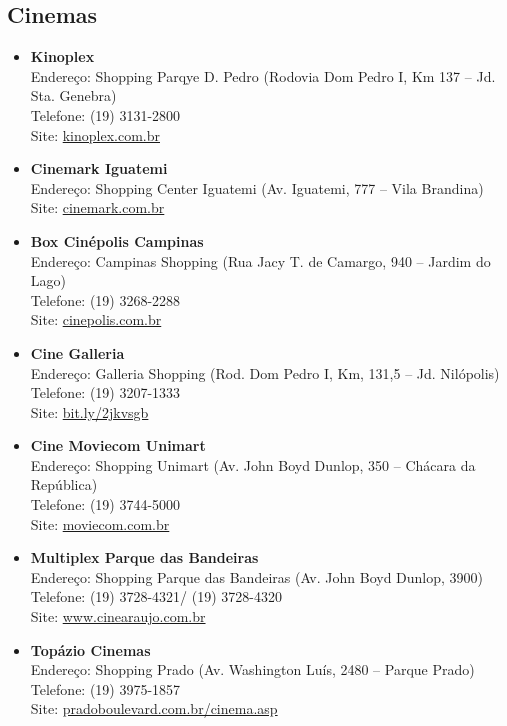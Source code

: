 \subsection{Cinemas}

\begin{itemize}
\item \textbf{Kinoplex}
  \\Endereço: Shopping Parqye D. Pedro (Rodovia Dom Pedro I, Km 137 -- Jd. Sta.
  Genebra)
  \\Telefone: (19) 3131-2800
  \\Site: \url{kinoplex.com.br}

\item \textbf{Cinemark Iguatemi}
  \\Endereço: Shopping Center Iguatemi (Av. Iguatemi, 777 -- Vila Brandina)
  \\Site: \url{cinemark.com.br}

\item \textbf{Box Cinépolis Campinas}
  \\Endereço: Campinas Shopping (Rua Jacy T. de Camargo, 940 -- Jardim do Lago)
  \\Telefone: (19) 3268-2288
  \\Site: \url{cinepolis.com.br}

\item \textbf{Cine Galleria}
  \\Endereço: Galleria Shopping (Rod. Dom Pedro I, Km, 131,5 -- Jd. Nilópolis)
  \\Telefone: (19) 3207-1333
  \\Site: \url{bit.ly/2jkvsgb}

\item \textbf{Cine Moviecom Unimart}
  \\Endereço: Shopping Unimart (Av. John Boyd Dunlop, 350 -- Chácara da
  República)
  \\Telefone: (19) 3744-5000
  \\Site: \url{moviecom.com.br}

\item \textbf{Multiplex Parque das Bandeiras}
  \\Endereço: Shopping Parque das Bandeiras (Av. John Boyd Dunlop, 3900)
  \\Telefone: (19) 3728-4321/ (19) 3728-4320
  \\Site: \url{www.cinearaujo.com.br}

\item \textbf{Topázio Cinemas}
  \\Endereço: Shopping Prado (Av. Washington Luís, 2480 -- Parque Prado)
  \\Telefone: (19) 3975-1857
  \\Site: \url{pradoboulevard.com.br/cinema.asp}
\end{itemize}

